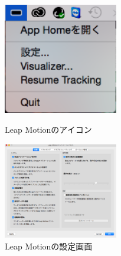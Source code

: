 \documentclass{funthesis}
\begin{document}
\begin{figure}[H]
 \begin{minipage}{0.5\hsize}
  \begin{center}
  \includegraphics[width=50mm]{./img/setting.png}
  \end{center}
  \caption{Leap Motionのアイコン}
  \label{setting}
 \end{minipage}
 \begin{minipage}{0.5\hsize}
  \begin{center}
  \includegraphics[width=50mm]{./img/Lset.png}
  \end{center}
  \caption{Leap Motionの設定画面}
  \label{Lset}
 \end{minipage}
\end{figure}



\listoffigures

\listoftables
\end{document}
